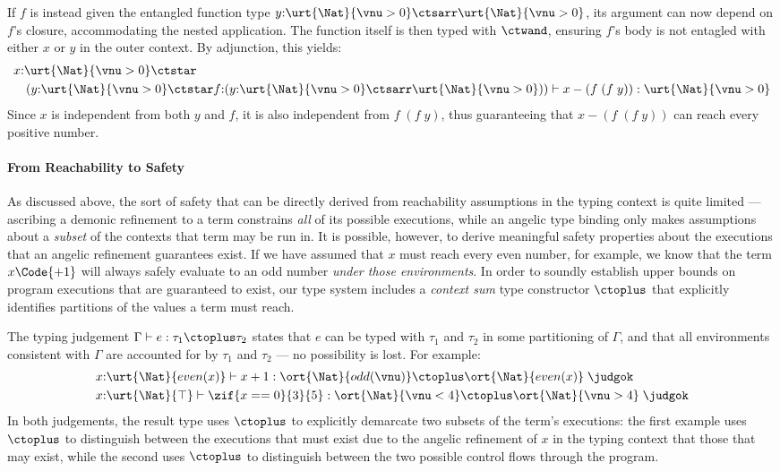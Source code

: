 If $f$ is instead given the entangled function type
$y{:}\urt{\Nat}{\vnu > 0} \ctsarr \urt{\Nat}{\vnu > 0}$, its argument
can now depend on $f$'s closure, accommodating the nested
application. The function itself is then typed with $\ctwand$,
ensuring $f$'s body is not entagled with either $x$ or $y$ in the
outer context. By adjunction, this yields:
\begin{align*}
  &x{:}\urt{\Nat}{\vnu > 0} \ctstar
  \\&\quad (y{:}\urt{\Nat}{\vnu > 0} \ctstar
  f{:}(y{:}\urt{\Nat}{\vnu > 0} \ctsarr \urt{\Nat}{\vnu > 0}))
  \vdash x - (f\; (f\;y)) : \urt{\Nat}{\vnu > 0}
\end{align*}\noindent
Since $x$ is independent from both $y$ and $f$, it is also independent
from $f\;(f\;y)$, thus guaranteeing that $x - (f\;(f\;y))$ can reach
every positive number.

\paragraph{From Reachability to Safety}
As discussed above, the sort of safety that can be directly derived
from reachability assumptions in the typing context is quite limited
--- ascribing a demonic refinement to a term constrains \emph{all} of
its possible executions, while an angelic type binding only makes
assumptions about a \emph{subset} of the contexts that term may be run
in. It is possible, however, to derive meaningful safety properties
about the executions that an angelic refinement guarantees exist. If
we have assumed that $x$ must reach every even number, for example, we
know that the term $x \Code{+ 1}$ will always safely evaluate to an
odd number \emph{under those environments}. In order to soundly
establish upper bounds on program executions that are guaranteed to
exist, our type system includes a \emph{context sum} type constructor
$\ctoplus$ that explicitly identifies partitions of the values a term
must reach.

The typing judgement $\Gamma \vdash e : \tau_1 \ctoplus \tau_2$ states
that $e$ can be typed with $\tau_1$ and $\tau_2$ in some partitioning
of $\Gamma$, and that all environments consistent with $\Gamma$ are
accounted for by $\tau_1$ and $\tau_2$ --- no possibility is lost.
For example:
\begin{align*}
  &x{:}\urt{\Nat}{even(x)} \vdash x + 1 : \ort{\Nat}{odd(\vnu)} \ctoplus
    \ort{\Nat}{even(x)} \;\judgok \\
  &x{:}\urt{\Nat}{\top} \vdash \zif{x == 0}{3}{5} : \ort{\Nat}{\vnu < 4}\ctoplus \ort{\Nat}{\vnu > 4} \;\judgok
\end{align*}\noindent
In both judgements, the result type uses $\ctoplus$ to explicitly
demarcate two subsets of the term's executions: the first example uses
$\ctoplus$ to distinguish between the executions that must exist due
to the angelic refinement of $x$ in the typing context that those that
may exist, while the second uses $\ctoplus$ to distinguish between the
two possible control flows through the program.

